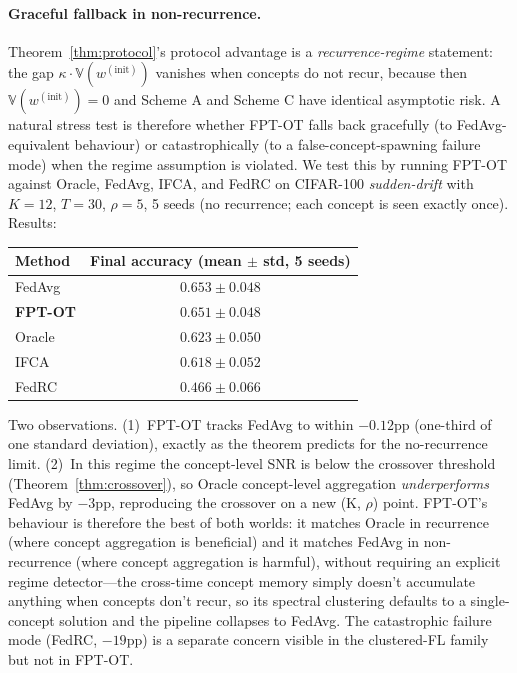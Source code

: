 \paragraph{Graceful fallback in non-recurrence.}
Theorem~\ref{thm:protocol}'s protocol advantage is a \emph{recurrence-regime} statement: the gap $\kappa \cdot \mathbb{V}(w^{(\mathrm{init})})$ vanishes when concepts do not recur, because then $\mathbb{V}(w^{(\mathrm{init})}) = 0$ and Scheme A and Scheme C have identical asymptotic risk. A natural stress test is therefore whether FPT-OT falls back gracefully (to FedAvg-equivalent behaviour) or catastrophically (to a false-concept-spawning failure mode) when the regime assumption is violated. We test this by running FPT-OT against Oracle, FedAvg, IFCA, and FedRC on CIFAR-100 \emph{sudden-drift} with $K{=}12$, $T{=}30$, $\rho{=}5$, 5 seeds (no recurrence; each concept is seen exactly once). Results:
\begin{center}
\small
\begin{tabular}{lc}
\toprule
Method & Final accuracy (mean $\pm$ std, 5 seeds) \\
\midrule
FedAvg              & $0.653 \pm 0.048$ \\
\textbf{FPT-OT}     & $\mathbf{0.651 \pm 0.048}$ \\
Oracle              & $0.623 \pm 0.050$ \\
IFCA                & $0.618 \pm 0.052$ \\
FedRC               & $0.466 \pm 0.066$ \\
\bottomrule
\end{tabular}
\end{center}
Two observations. (1)~FPT-OT tracks FedAvg to within $-0.12$pp (one-third of one standard deviation), exactly as the theorem predicts for the no-recurrence limit. (2)~In this regime the concept-level SNR is below the crossover threshold (Theorem~\ref{thm:crossover}), so Oracle concept-level aggregation \emph{underperforms} FedAvg by $-3$pp, reproducing the crossover on a new (K, $\rho$) point. FPT-OT's behaviour is therefore the best of both worlds: it matches Oracle in recurrence (where concept aggregation is beneficial) and it matches FedAvg in non-recurrence (where concept aggregation is harmful), without requiring an explicit regime detector---the cross-time concept memory simply doesn't accumulate anything when concepts don't recur, so its spectral clustering defaults to a single-concept solution and the pipeline collapses to FedAvg. The catastrophic failure mode (FedRC, $-19$pp) is a separate concern visible in the clustered-FL family but not in FPT-OT.

